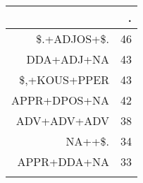 \begin{tabular}{rr}
  \lsptoprule
 & . \\ 
  \midrule
\$.+ADJOS+\$. &  46 \\ 
  DDA+ADJ+NA &  43 \\ 
  \$,+KOUS+PPER &  43 \\ 
  APPR+DPOS+NA &  42 \\ 
  ADV+ADV+ADV &  38 \\ 
  NA++\$. &  34 \\ 
  APPR+DDA+NA &  33 \\ 
   \lspbottomrule
\end{tabular}
